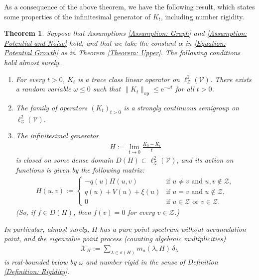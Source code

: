 \documentclass{amsart}
\numberwithin{equation}{section}
\newtheorem{theorem}{Theorem}[section]
\theoremstyle{definition}
\newcommand\al{\alpha}
\newcommand\de{\delta}
\newcommand\la{\lambda}
\newcommand\om{\omega}
\newcommand\si{\sigma}
\newcommand\mc{\mathcal}
\newcommand\mr{\mathrm}
\newcommand\ms{\mathscr}
\begin{document}
%

As a consequence of the above theorem, we have the following result,
which states some properties of the infinitesimal generator of $K_t$, including number rigidity.

%

\begin{theorem}
\label{Theorem: Rigidity}
Suppose that Assumptions \ref{Assumption: Graph} and \ref{Assumption: Potential and Noise} hold,
and that we take the constant $\al$ in \eqref{Equation: Potential Growth} as in Theorem \ref{Theorem: Upper}.
The following conditions hold almost surely.
\begin{enumerate}
\item For every $t>0$, $K_t$ is a trace class linear operator
on $\ell^2_\ms Z(\ms V)$. There exists a random variable $\om\leq0$
such that $\|K_t\|_{\mr{op}}\leq\mr e^{-\om t}$ for all $t>0$.
\item The family of operators
$(K_t)_{t>0}$ is a strongly continuous semigroup
on $\ell^2_\ms Z(\ms V)$.
\item The infinitesimal generator
\begin{align}
\label{Equation: Infinitesimal Generator}
H:=\lim_{t\to0}\frac{K_0-K_t}{t}
\end{align}
is closed on some dense domain $D(H)\subset\ell^2_\ms Z(\ms V)$,
and its action on functions is given by the following matrix:
\begin{align}
\label{Equation: Schrodinger Generator}
H(u,v):=\begin{cases}
-q(u)\Pi(u,v)&\text{if }u\neq v\text{ and }u,v\not\in\ms Z,\\
q(u)+V(u)+\xi(u)&\text{if }u=v\text{ and }u\not\in\ms Z,\\
0&\text{if }u\in\ms Z\text{ or }v\in\ms Z.
\end{cases}
\end{align}
(So, if $f\in D(H)$, then $f(v)=0$ for every $v\in\ms Z$.)
\end{enumerate}
In particular, almost surely,
$H$ has a pure point spectrum without accumulation point,
and the eigenvalue point process (counting algebraic multiplicities)
\begin{align}
\label{Equation: Eigenvalue Point Process}
\mc X_H:=\sum_{\la\in\si(H)} m_a(\la,H)\,\de_\la
\end{align}
is real-bounded below by $\om$
and number rigid in the sense of Definition \ref{Definition: Rigidity}.
\end{theorem}
\end{document}
